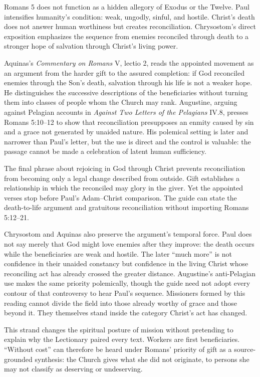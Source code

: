 \begin{deepstudy}
Romans 5 does not function as a hidden allegory of Exodus or the Twelve. Paul intensifies humanity's condition: weak, ungodly, sinful, and hostile. Christ's death does not answer human worthiness but creates reconciliation. Chrysostom's direct exposition emphasizes the sequence from enemies reconciled through death to a stronger hope of salvation through Christ's living power.

Aquinas's \emph{Commentary on Romans} V, lectio 2, reads the appointed movement as an argument from the harder gift to the assured completion: if God reconciled enemies through the Son's death, salvation through his life is not a weaker hope. He distinguishes the successive descriptions of the beneficiaries without turning them into classes of people whom the Church may rank. Augustine, arguing against Pelagian accounts in \emph{Against Two Letters of the Pelagians} IV.8, presses Romans 5:10--12 to show that reconciliation presupposes an enmity caused by sin and a grace not generated by unaided nature. His polemical setting is later and narrower than Paul's letter, but the use is direct and the control is valuable: the passage cannot be made a celebration of latent human sufficiency.

The final phrase about rejoicing in God through Christ prevents reconciliation from becoming only a legal change described from outside. Gift establishes a relationship in which the reconciled may glory in the giver. Yet the appointed verses stop before Paul's Adam--Christ comparison. The guide can state the death-to-life argument and gratuitous reconciliation without importing Romans 5:12--21.

Chrysostom and Aquinas also preserve the argument's temporal force. Paul does not say merely that God might love enemies after they improve: the death occurs while the beneficiaries are weak and hostile. The later “much more” is not confidence in their unaided constancy but confidence in the living Christ whose reconciling act has already crossed the greater distance. Augustine's anti-Pelagian use makes the same priority polemically, though the guide need not adopt every contour of that controversy to hear Paul's sequence. Missioners formed by this reading cannot divide the field into those already worthy of grace and those beyond it. They themselves stand inside the category Christ's act has changed.

This strand changes the spiritual posture of mission without pretending to explain why the Lectionary paired every text. Workers are first beneficiaries. “Without cost” can therefore be heard under Romans' priority of gift as a source-grounded synthesis: the Church gives what she did not originate, to persons she may not classify as deserving or undeserving.


\end{deepstudy}
